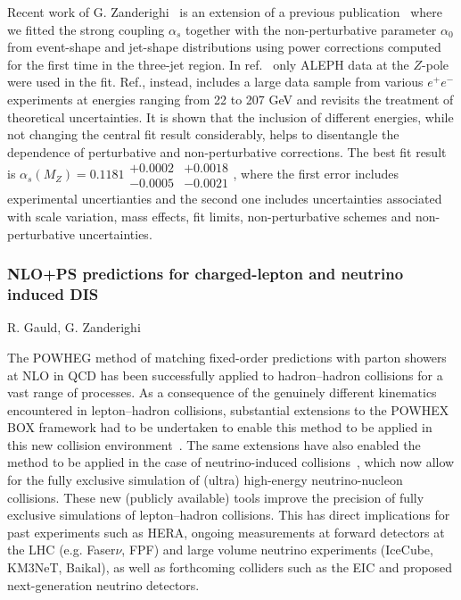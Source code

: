 \documentclass{FBR_Bericht_2025}
\begin{document}
\begin{refsection}
%
Recent work of G. Zanderighi~\cite{Nason:2025qbx} is an extension of a previous
publication~\cite{Nason:2023asn} where we fitted the strong coupling
$\alpha_s$ together with the non-perturbative parameter $\alpha_0$ from
event-shape and jet-shape distributions using power corrections
computed for the first time in the three-jet region.
%
In ref.~\cite{Nason:2023asn} only ALEPH data at the $Z$-pole were
used in the fit. Ref.\cite{Nason:2025qbx}, instead, includes a large data sample from
various $e^+e^-$ experiments at energies ranging from 22 to 207
GeV and revisits the treatment of theoretical uncertainties.
%
It is shown that the inclusion of different energies, while not
changing the central fit result considerably, helps to disentangle the
dependence of perturbative and non-perturbative corrections.
%
The best fit result is $\alpha_s(M_Z) = 0.1181 \substack{ +0.0002
  \\ -0.0005} \substack{ +0.0018 \\ -0.0021}$, where the first error
includes experimental uncertianties and the second one includes
uncertainties associated with scale variation, mass effects, fit
limits, non-perturbative schemes and non-perturbative uncertainties.

\subsubsection{NLO+PS predictions for charged-lepton and neutrino induced DIS}
\begin{Namen}
R. Gauld, G. Zanderighi
\end{Namen}
The POWHEG method of matching fixed-order predictions with parton showers at NLO in QCD has been successfully applied to hadron--hadron collisions for a vast range of processes. As a consequence of the genuinely different kinematics encountered in lepton--hadron collisions, substantial extensions to the POWHEX BOX framework had to be undertaken to enable this method to be applied in this new collision environment~\cite{Banfi:2023mhz}.
The same extensions have also enabled the method to be applied in the case of neutrino-induced collisions~\cite{FerrarioRavasio:2024kem}, which now allow for the fully exclusive simulation of (ultra) high-energy neutrino-nucleon collisions.
These new (publicly available) tools improve the precision of fully exclusive simulations of lepton--hadron collisions. This has direct implications for past experiments such as HERA, ongoing measurements at forward detectors at the LHC (e.g. Faser$\nu$, FPF) and large volume neutrino experiments (IceCube, KM3NeT, Baikal), as well as forthcoming colliders such as the EIC and proposed next-generation neutrino detectors.
%



\end{refsection}
\end{document}
